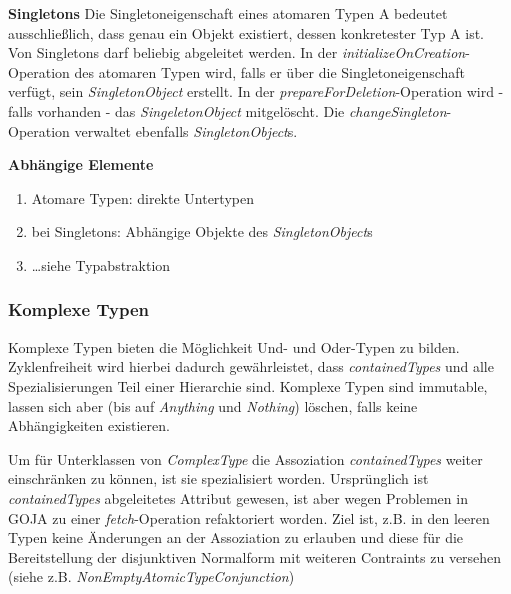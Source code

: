 \textbf{Singletons} \newline
Die Singletoneigenschaft eines atomaren Typen A bedeutet ausschließlich, dass genau ein Objekt existiert, dessen konkretester Typ A ist.
Von Singletons darf beliebig abgeleitet werden. 
In der \emph{initializeOnCreation}-Operation des atomaren Typen wird, falls er über die Singletoneigenschaft verfügt, 
sein \emph{SingletonObject} erstellt. In der \emph{prepareForDeletion}-Operation wird - falls vorhanden - das \emph{SingeletonObject}
mitgelöscht. Die \emph{changeSingleton}-Operation verwaltet ebenfalls \emph{SingletonObject}s. 
 
\textbf{Abhängige Elemente}
\begin{enumerate}
  		\item Atomare Typen: direkte Untertypen
  		\item bei Singletons: Abhängige Objekte des \emph{SingletonObject}s
  		\item \ldots siehe Typabstraktion
\end{enumerate}

\subsubsection{Komplexe Typen}

Komplexe Typen bieten die Möglichkeit Und- und Oder-Typen zu bilden. Zyklenfreiheit wird hierbei dadurch gewährleistet, 
dass \emph{containedTypes} und alle Spezialisierungen Teil einer Hierarchie sind. Komplexe Typen sind immutable,
lassen sich aber (bis auf \emph{Anything} und \emph{Nothing}) löschen, falls keine Abhängigkeiten existieren.


Um für Unterklassen von \emph{ComplexType} die Assoziation \emph{containedTypes} weiter einschränken zu 
können, ist sie spezialisiert worden. Ursprünglich ist \emph{containedTypes} abgeleitetes Attribut gewesen,
ist aber wegen Problemen in GOJA zu einer \emph{fetch}-Operation refaktoriert worden. 
Ziel ist, z.B. in den leeren Typen keine Änderungen an der Assoziation zu erlauben und diese für die Bereitstellung 
der disjunktiven Normalform mit weiteren Contraints zu versehen (siehe z.B. \emph{NonEmptyAtomicTypeConjunction}) 



